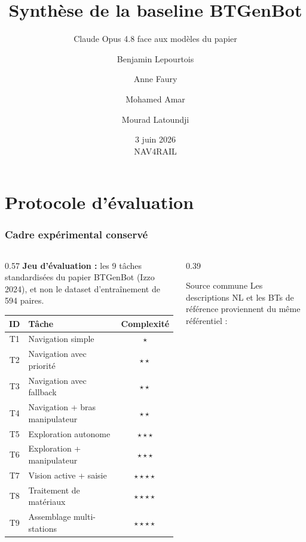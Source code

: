 \documentclass[aspectratio=169]{beamer}
\title{Synthèse de la baseline BTGenBot}
\subtitle{Claude Opus 4.8 face aux modèles du papier}
\author{Benjamin Lepourtois \and Anne Faury \and Mohamed Amar \and Mourad Latoundji}
\institute{Télécom Paris}
\date[3 juin 2026]{3 juin 2026 \\ {\small NAV4RAIL}}
\begin{document}
\maketitle

\section{Protocole d'évaluation}

\begin{frame}
  \frametitle{Cadre expérimental conservé}

  \begin{columns}[T]
    \begin{column}{0.57\textwidth}
      \small
      \textbf{Jeu d'évaluation :} les 9 tâches standardisées du papier BTGenBot (Izzo 2024), et non le dataset d'entraînement de 594 paires.

      \vspace{0.4em}
      \begin{center}
        \begin{tabular}{clc}
          \toprule
          ID & Tâche & Complexité \\
          \midrule
          T1 & Navigation simple & $\star$ \\
          T2 & Navigation avec priorité & $\star\star$ \\
          T3 & Navigation avec fallback & $\star\star$ \\
          T4 & Navigation + bras manipulateur & $\star\star$ \\
          T5 & Exploration autonome & $\star\star\star$ \\
          T6 & Exploration + manipulateur & $\star\star\star$ \\
          T7 & Vision active + saisie & $\star\star\star\star$ \\
          T8 & Traitement de matériaux & $\star\star\star\star$ \\
          T9 & Assemblage multi-stations & $\star\star\star\star$ \\
          \bottomrule
        \end{tabular}
      \end{center}
    \end{column}
    \begin{column}{0.39\textwidth}
      \begin{exampleblock}{Source commune}
        \small
        Les descriptions NL et les BTs de référence proviennent du même référentiel :


\end{exampleblock}
\end{column}
\end{columns}
\end{frame}
\end{document}
